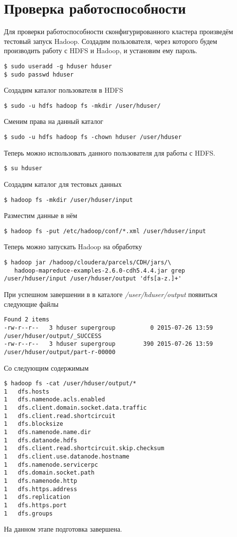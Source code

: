 \newpage

\section{Проверка работоспособности}
Для проверки работоспособности сконфигурированного кластера произведём тестовый запуск Hadoop. 
Создадим пользователя, через которого будем производить работу с HDFS и Hadoop, и установим ему пароль.
\begin{lstlisting}
$ sudo useradd -g hduser hduser
$ sudo passwd hduser
\end{lstlisting}
Создадим каталог пользователя в HDFS
\begin{lstlisting}
$ sudo -u hdfs hadoop fs -mkdir /user/hduser/
\end{lstlisting}
Сменим права на данный каталог
\begin{lstlisting}
$ sudo -u hdfs hadoop fs -chown hduser /user/hduser
\end{lstlisting}
Теперь можно использовать данного пользователя для работы с HDFS.
\begin{lstlisting}
$ su hduser
\end{lstlisting}
Создадим каталог для тестовых данных
\begin{lstlisting}
$ hadoop fs -mkdir /user/hduser/input
\end{lstlisting}
Разместим данные в нём
\begin{lstlisting}
$ hadoop fs -put /etc/hadoop/conf/*.xml /user/hduser/input 
\end{lstlisting}
Теперь можно запускать Hadoop на обработку
\begin{lstlisting}
$ hadoop jar /hadoop/cloudera/parcels/CDH/jars/\
   hadoop-mapreduce-examples-2.6.0-cdh5.4.4.jar grep /user/hduser/input /user/hduser/output 'dfs[a-z.]+'
\end{lstlisting}
При успешном завершении в в каталоге \emph{/user/hduser/output} появиться следующие файлы
\begin{lstlisting}
Found 2 items
-rw-r--r--   3 hduser supergroup          0 2015-07-26 13:59 /user/hduser/output/_SUCCESS
-rw-r--r--   3 hduser supergroup        390 2015-07-26 13:59 /user/hduser/output/part-r-00000
\end{lstlisting}
Со следующим содержимым
\begin{lstlisting}
$ hadoop fs -cat /user/hduser/output/*
1   dfs.hosts
1   dfs.namenode.acls.enabled
1   dfs.client.domain.socket.data.traffic
1   dfs.client.read.shortcircuit
1   dfs.blocksize
1   dfs.namenode.name.dir
1   dfs.datanode.hdfs
1   dfs.client.read.shortcircuit.skip.checksum
1   dfs.client.use.datanode.hostname
1   dfs.namenode.servicerpc
1   dfs.domain.socket.path
1   dfs.namenode.http
1   dfs.https.address
1   dfs.replication
1   dfs.https.port
1   dfs.groups
\end{lstlisting}
На данном этапе подготовка завершена.

